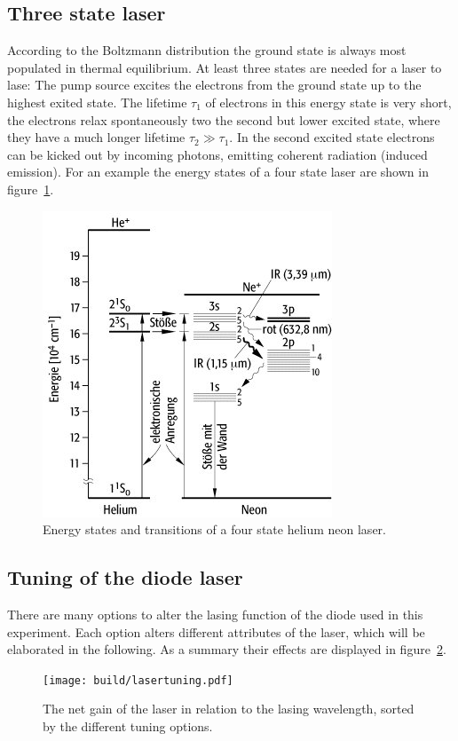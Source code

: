 \subsection{Three state laser}\label{three-state-laser}

According to the Boltzmann distribution the ground state is always most populated in thermal
equilibrium.
At least three states are needed for a laser to lase: The pump source excites the electrons from
the ground state up to the highest exited state.
The lifetime \(\tau_1\) of electrons in this energy state is very short, the electrons relax
spontaneously two the second but lower excited state, where they have a much longer lifetime
\(\tau_2 \gg \tau_1\).
In the second excited state electrons can be kicked out by incoming photons, emitting coherent
radiation (induced emission).
For an example the energy states of a four state laser are shown in
figure~\ref{fig:four_state_laser}.
\begin{figure}[ht]
  \centering
  \includegraphics[width=0.6\linewidth]{content/uebergaenge.jpg}
  \caption{Energy states and transitions of a four state helium neon laser\cite{anleitung_hene}.}%
  \label{fig:four_state_laser}
\end{figure}

\subsection{Tuning of the diode laser}\label{tuning-of-the-diode-laser}

There are many options to alter the lasing function of the diode used in this experiment.
Each option alters different attributes of the laser, which will be elaborated in the following.
As a summary their effects are displayed in figure~\ref{fig:lasertuning}.
\begin{figure}[ht]
  \centering
  \texttt{[image: build/lasertuning.pdf]}
  \caption{The net gain of the laser in relation to the lasing wavelength, sorted by the different
  tuning options\cite{anleitung}.}%
  \label{fig:lasertuning}
\end{figure}

